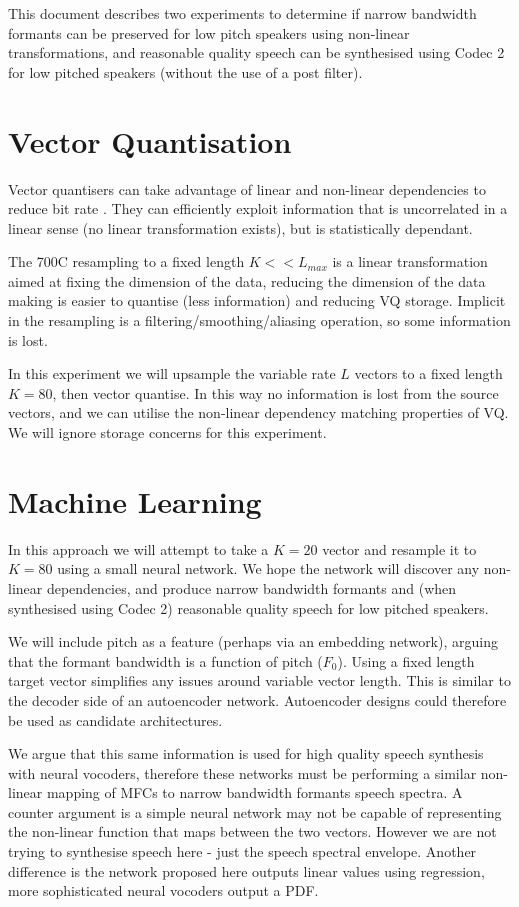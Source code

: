 \documentclass{article}
\begin{document}
This document describes two experiments to determine if narrow bandwidth formants can be preserved for low pitch speakers using non-linear transformations, and reasonable quality speech can be synthesised using Codec 2 for low pitched speakers (without the use of a post filter).  

\section{Vector Quantisation}

Vector quantisers can take advantage of linear and non-linear dependencies to reduce bit rate \cite{makhoul1985vector}.  They can efficiently exploit information that is uncorrelated in a linear sense (no linear transformation exists), but is statistically dependant.

The 700C resampling to a fixed length $K<<L_{max}$ is a linear transformation aimed at fixing the dimension of the data, reducing the dimension of the data making is easier to quantise (less information) and reducing VQ storage.  Implicit in the resampling is a filtering/smoothing/aliasing operation, so some information is lost.

In this experiment we will upsample the variable rate $L$ vectors to a fixed length $K=80$, then vector quantise.  In this way no information is lost from the source vectors, and we can utilise the non-linear dependency matching properties of VQ.  We will ignore storage concerns for this experiment. 

\section{Machine Learning}

In this approach we will attempt to take a $K=20$ vector and resample it to $K=80$ using a small neural network.   We hope the network will discover any non-linear dependencies, and produce narrow bandwidth formants and (when synthesised using Codec 2) reasonable quality speech for low pitched speakers.  

We will include pitch as a feature (perhaps via an embedding network), arguing that the formant bandwidth is a function of pitch ($F_0$).  Using a fixed length target vector simplifies any issues around variable vector length.  This is similar to the decoder side of an autoencoder network.  Autoencoder designs could therefore be used as candidate architectures.

We argue that this same information is used for high quality speech synthesis with neural vocoders, therefore these networks must be performing a similar non-linear mapping of MFCs to narrow bandwidth formants speech spectra.   A counter argument is a simple neural network may not be capable of representing the non-linear function that maps between the two vectors.  However we are not trying to synthesise speech here - just the speech spectral envelope.  Another difference is the network proposed here outputs linear values using regression, more sophisticated neural vocoders output a PDF.
\end{document}
